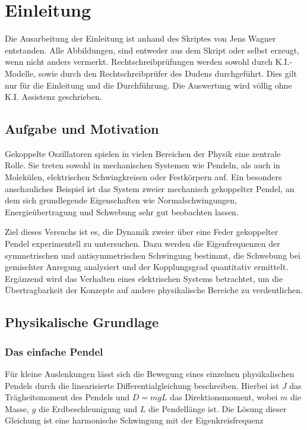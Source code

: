\chapter{Einleitung} \label{ch:Einleitung}

Die Ausarbeitung der Einleitung ist anhand des Skriptes von Jens Wagner entstanden. Alle Abbildungen, sind entweder aus dem Skript oder selbst erzeugt, wenn nicht anders vermerkt. Rechtschreibprüfungen werden sowohl durch K.I.-Modelle, sowie durch den Rechtschreibprüfer des Dudens durchgeführt.  Dies gilt nur für die Einleitung und die Durchführung. Die Auswertung wird völlig ohne K.I. Assistenz geschrieben. \cite{skriptPAP21, Duden}


\section{Aufgabe und Motivation} \label{sec:AuM}

Gekoppelte Oszillatoren spielen in vielen Bereichen der Physik eine zentrale Rolle. Sie treten sowohl in mechanischen Systemen wie Pendeln, als auch in Molekülen, elektrischen Schwingkreisen oder Festkörpern auf. Ein besonders anschauliches Beispiel ist das System zweier mechanisch gekoppelter Pendel, an dem sich grundlegende Eigenschaften wie Normalschwingungen, Energieübertragung und Schwebung sehr gut beobachten lassen.

Ziel dieses Versuchs ist es, die Dynamik zweier über eine Feder gekoppelter Pendel experimentell zu untersuchen. Dazu werden die Eigenfrequenzen der symmetrischen und antisymmetrischen Schwingung bestimmt, die Schwebung bei gemischter Anregung analysiert und der Kopplungsgrad quantitativ ermittelt. Ergänzend wird das Verhalten eines elektrischen Systems betrachtet, um die Übertragbarkeit der Konzepte auf andere physikalische Bereiche zu verdeutlichen.


\section{Physikalische Grundlage} \label{sec:PhyBasics}

\subsection{Das einfache Pendel}

Für kleine Auslenkungen lässt sich die Bewegung eines einzelnen physikalischen Pendels durch die linearisierte Differentialgleichung
beschreiben. Hierbei ist \(J\) das Trägheitsmoment des Pendels und \(D = mgL\) das Direktionsmoment, wobei \(m\) die Masse, \(g\) die Erdbeschleunigung und \(L\) die Pendellänge ist. Die Lösung dieser Gleichung ist eine harmonische Schwingung mit der Eigenkreisfrequenz

